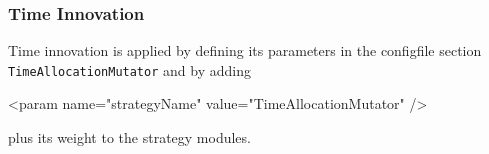 %


\subsubsection{Time Innovation}
\label{sec:timechoice}
Time innovation is applied by defining its parameters in the \gls{configfile} section \lstinline|TimeAllocationMutator| and by adding 
%
\begin{xml}
	<param name="strategyName" value="TimeAllocationMutator" />
\end{xml}
%
plus its weight to the strategy modules.

